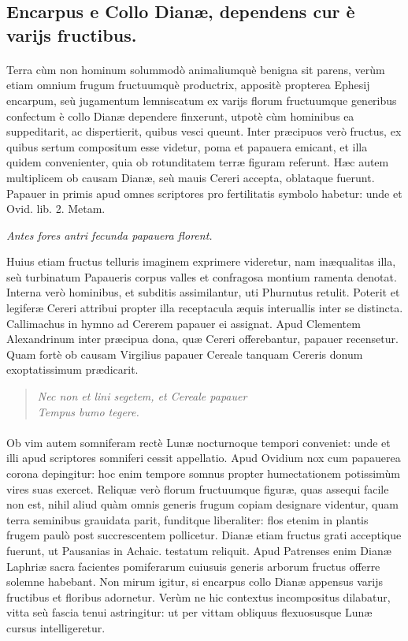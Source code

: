 \documentclass[a4paper, 11pt, oneside, polutonikogreek, latin]{article}
\begin{document}
\subsection{Encarpus e Collo Dianæ, dependens cur è varijs fructibus.}
\paragraph{}
Terra cùm non hominum solummodò animaliumquè benigna sit parens, verùm etiam omnium frugum fructuumquè productrix, appositè propterea Ephesij encarpum, seù jugamentum lemniscatum ex varijs florum fructuumque generibus confectum è collo Dianæ dependere finxerunt, utpotè cùm hominibus ea suppeditarit, ac dispertierit, quibus vesci queunt. Inter præcipuos verò fructus, ex quibus sertum compositum esse videtur, poma et papauera emicant, et illa quidem convenienter, quia ob rotunditatem terræ figuram referunt. Hæc autem multiplicem ob causam Dianæ, seù mauis Cereri accepta, oblataque fuerunt. Papauer in primis apud omnes scriptores pro fertilitatis symbolo habetur: unde et Ovid. lib. 2. Metam.

\emph{Antes fores antri fecunda papauera florent.}

Huius etiam fructus telluris imaginem exprimere videretur, nam inæqualitas illa, seù turbinatum Papaueris corpus valles et confragosa montium ramenta denotat. Interna verò hominibus, et subditis assimilantur, uti Phurnutus retulit. Poterit et legiferæ Cereri attribui propter illa receptacula æquis interuallis inter se distincta. Callimachus in hymno ad Cererem papauer ei assignat. Apud Clementem Alexandrinum inter præcipua dona, quæ Cereri offerebantur, papauer recensetur. Quam fortè ob causam Virgilius papauer Cereale tanquam Cereris donum exoptatissimum prædicarit.
\begin{quote}
\emph{Nec non et lini segetem, et Cereale papauer}\\
\emph{Tempus bumo tegere.}\\
\end{quote}
\paragraph{}
Ob vim autem somniferam rectè Lunæ nocturnoque tempori conveniet: unde et illi apud scriptores somniferi cessit appellatio. Apud Ovidium nox cum papauerea corona depingitur: hoc enim tempore somnus propter humectationem potissimùm vires suas exercet. Reliquæ verò florum fructuumque figuræ, quas assequi facile non est, nihil aliud quàm omnis generis frugum copiam designare videntur, quam terra seminibus grauidata parit, funditque liberaliter: flos etenim in plantis frugem paulò post succrescentem pollicetur. Dianæ etiam fructus grati acceptique fuerunt, ut Pausanias in Achaic. testatum reliquit. Apud Patrenses enim Dianæ Laphriæ sacra facientes pomiferarum cuiusuis generis arborum fructus offerre solemne habebant. Non mirum igitur, si encarpus collo Dianæ appensus varijs fructibus et floribus adornetur. Verùm ne hic contextus incompositus dilabatur, vitta seù fascia tenui astringitur: ut per vittam obliquus flexuosusque Lunæ cursus intelligeretur.
\clearpage
\end{document}
